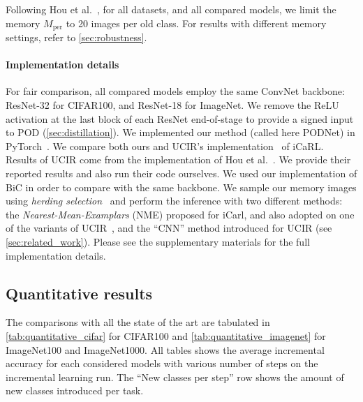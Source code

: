 Following Hou et al.~\citep{hou2019ucir}, for all datasets, and all compared models, we limit the
memory $M_\textrm{per}$ to 20 images per old class. For results with different memory settings,
refer to \autoref{sec:robustness}.

\paragraph{Implementation details} For fair comparison, all compared models employ the same ConvNet
backbone: ResNet-32 for CIFAR100, and ResNet-18 for ImageNet. We remove the ReLU activation at the
last block of each ResNet end-of-stage to provide a signed input to POD
(\autoref{sec:distillation}). We implemented our method (called here PODNet) in
PyTorch~\citep{paszke2017pytorch}.
%
We compare both ours and UCIR's implementation~\citep{hou2019ucir} of iCaRL. Results of UCIR come
from the implementation of Hou et al.~\citep{hou2019ucir}. We provide their reported results and
also run their code ourselves. We used our implementation of BiC in order to compare with the same
backbone.
%
We sample our memory images using \textit{herding selection}~\citep{rebuffi2017icarl} and perform
the inference with two different methods: the \textit{Nearest-Mean-Examplars} (NME) proposed for
iCarl, and also adopted on one of the variants of UCIR~\citep{hou2019ucir}, and the ``CNN'' method
introduced for UCIR (see \autoref{sec:related_work}).
%
Please see the supplementary materials for the full implementation details.



\subsection{Quantitative results}
\label{sec:podnet_quantitative_results}

The comparisons with all the state of the art are tabulated in \autoref{tab:quantitative_cifar} for
CIFAR100 and \autoref{tab:quantitative_imagenet} for ImageNet100 and ImageNet1000. All tables shows
the average incremental accuracy for each considered models with various number of steps on the
incremental learning run. The ``New classes per step'' row shows the amount of new classes
introduced per task.

